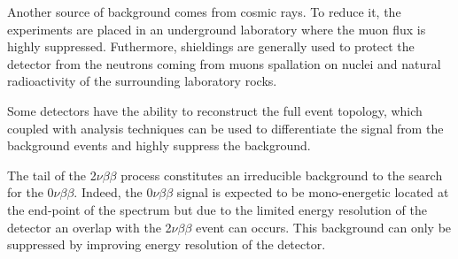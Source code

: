 \documentclass[main.tex]{subfiles}
\begin{document}
\bigskip  





\NI Another source of background comes from cosmic rays. To reduce it, the experiments are placed in an underground laboratory where the muon flux is highly suppressed. Futhermore, shieldings are generally used to protect the detector from the neutrons coming from muons spallation on nuclei and natural radioactivity of the surrounding laboratory rocks.


\bigskip


\NI Some detectors have the ability to reconstruct the full event topology,  which coupled with analysis techniques can be used to differentiate the signal from the background events and highly suppress the background.


\bigskip


\NI The tail of the 2$\nu\beta\beta$ process constitutes an irreducible background to the search for the 0$\nu\beta\beta$. Indeed, the 0$\nu\beta\beta$ signal is expected to be mono-energetic located at the end-point of the spectrum but due to the limited energy resolution of the detector an overlap with the 2$\nu\beta\beta$ event can occurs. This background can only be suppressed by improving energy resolution of the detector.  
\end{document}
